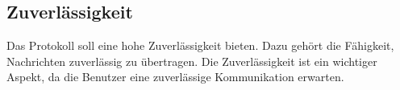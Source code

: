 \subsection{Zuverlässigkeit}

Das Protokoll soll eine hohe Zuverlässigkeit bieten. Dazu gehört die Fähigkeit, Nachrichten
zuverlässig zu übertragen. Die Zuverlässigkeit ist ein wichtiger Aspekt, da die Benutzer eine
zuverlässige Kommunikation erwarten.
